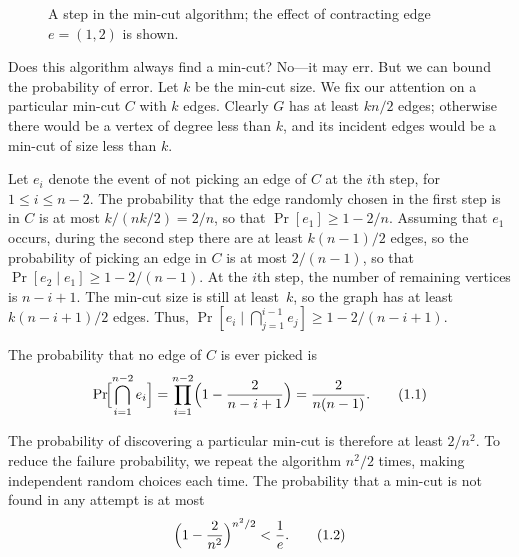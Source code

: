 \documentclass[twoside,12pt]{book}
\theoremstyle{plain}
\theoremstyle{definition}
\theoremstyle{remark}
\begin{document}
\begin{figure}[htbp]
\centering
{}
\caption{A step in the min-cut algorithm; the effect of contracting
  edge $e=(1,2)$ is shown.}
\label{fig:contraction}
\end{figure}

Does this algorithm always find a min-cut? No---it may err. But we can
bound the probability of error. Let $k$ be the min-cut size. We fix our
attention on a particular min-cut $C$ with $k$ edges. Clearly $G$ has at
least $kn/2$ edges; otherwise there would be a vertex of degree less than
$k$, and its incident edges would be a min-cut of size less than $k$.

Let $e_i$ denote the event of not picking an edge of $C$ at the $i$th step,
for $1 \le i \le n-2$. The probability that the edge randomly chosen in the
first step is in $C$ is at most $k/(nk/2)=2/n$, so that $\Pr[e_1] \ge
1-2/n$. Assuming that $e_1$ occurs, during the second step there are at
least $k(n{-}1)/2$ edges, so the probability of picking an edge in $C$ is at
most $2/(n{-}1)$, so that $\Pr[e_2 \mid e_1] \ge 1-2/(n{-}1)$. At the $i$th
step, the number of remaining vertices is $n-i+1$. The min-cut size is still
at least~$k$, so the graph has at least $k(n{-}i{+}1)/2$ edges. Thus,
$\Pr[e_i \mid \bigcap_{j=1}^{i-1} e_j] \ge 1-2/(n{-}i{+}1)$.

The probability that no edge of $C$ is ever picked is
\begin{equation*}
  \Pr\!\Bigl[\bigcap_{i=1}^{n-2} e_i\Bigr]
  = \prod_{i=1}^{n-2}\Bigl(1-\frac{2}{n-i+1}\Bigr)
  = \frac{2}{n(n-1)}.
  \tag{1.1}
\end{equation*}

The probability of discovering a particular min-cut is therefore at least
$2/n^2$. To reduce the failure probability, we repeat the algorithm
$n^2/2$ times, making independent random choices each time. The probability
that a min-cut is not found in any attempt is at most
\begin{equation*}
  \Bigl(1-\frac{2}{n^2}\Bigr)^{n^2/2} < \frac{1}{e}.
  \tag{1.2}
\end{equation*}
\end{document}
